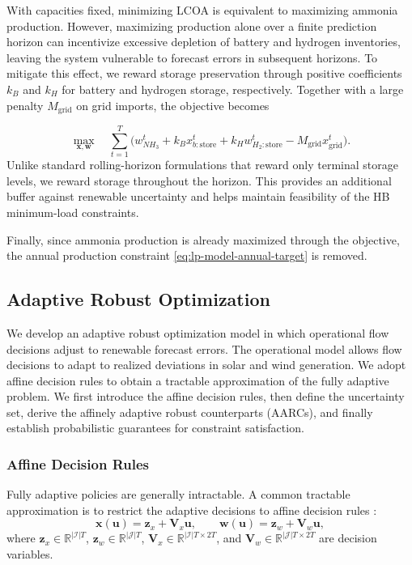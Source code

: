 \documentclass[11pt, letter]{article}
\begin{document}
With capacities fixed, minimizing LCOA is equivalent to maximizing ammonia production. However, maximizing production alone over a finite prediction horizon can incentivize excessive depletion of battery and hydrogen inventories, leaving the system vulnerable to forecast errors in subsequent horizons. To mitigate this effect, we reward storage preservation through positive coefficients $k_B$ and $k_H$ for battery and hydrogen storage, respectively. Together with a large penalty $M_{\mathrm{grid}}$ on grid imports, the objective becomes

\begin{equation}\label{eq:operational-objective}
    \max_{\boldsymbol{x},\boldsymbol{w}}
    \quad
    \sum_{t=1}^{T}
    \Big(
    w_{NH_3}^{t}
    + k_B x_{b:\mathrm{store}}^{t}
    + k_H w_{H_2:\mathrm{store}}^{t}
    - M_{\mathrm{grid}} x_{\mathrm{grid}}^{t}
    \Big).
\end{equation}
Unlike standard rolling-horizon formulations that reward only terminal storage levels, we reward storage throughout the horizon. This provides an additional buffer against renewable uncertainty and helps maintain feasibility of the HB minimum-load constraints.

Finally, since ammonia production is already maximized through the objective, the annual production constraint \eqref{eq:lp-model-annual-target} is removed.

\subsection{Adaptive Robust Optimization}

We develop an adaptive robust optimization model in which operational flow decisions adjust to renewable forecast errors. The operational model allows flow decisions to adapt to realized deviations in solar and wind generation. We adopt affine decision rules to obtain a tractable approximation of the fully adaptive problem. We first introduce the affine decision rules, then define the uncertainty set, derive the affinely adaptive robust counterparts (AARCs), and finally establish probabilistic guarantees for constraint satisfaction.

\subsubsection{Affine Decision Rules}

Fully adaptive policies are generally intractable. A common tractable approximation is to restrict the adaptive decisions to affine decision rules \citep{ben-tal_adjustable_2004}:
\[
\boldsymbol{x}(\boldsymbol{u})
=
\boldsymbol{z}_x
+
\boldsymbol{V}_x\boldsymbol{u},
\qquad
\boldsymbol{w}(\boldsymbol{u})
=
\boldsymbol{z}_w
+
\boldsymbol{V}_w\boldsymbol{u},
\]
where
$\boldsymbol{z}_x \in \mathbb{R}^{|\mathcal{I}|T}$,
$\boldsymbol{z}_w \in \mathbb{R}^{|\mathcal{J}|T}$,
$\boldsymbol{V}_x \in \mathbb{R}^{|\mathcal{I}|T \times 2T}$,
and
$\boldsymbol{V}_w \in \mathbb{R}^{|\mathcal{J}|T \times 2T}$
are decision variables.
\end{document}

